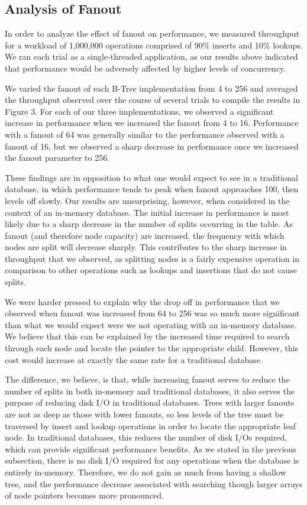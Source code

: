 \documentclass{sig-alternate}
\begin{document}
\subsection{Analysis of Fanout}
In order to analyze the effect of fanout on performance, we measured throughput for a workload of 1,000,000 operations comprised of 90\% inserts and 10\% lookups. We ran each trial as a single-threaded application, as our results above indicated that performance would be adversely affected by higher levels of concurrency.

We varied the fanout of each B-Tree implementation from 4 to 256 and averaged the throughput observed over the course of several trials to compile the results in Figure 3. For each of our three implementations, we observed a significant increase in performance when we increased the fanout from 4 to 16. Performance with a fanout of 64 was generally similar to the performance observed with a fanout of 16, but we observed a sharp decrease in performance once we increased the fanout parameter to 256. 

These findings are in opposition to what one would expect to see in a traditional database, in which performance tends to peak when fanout approaches 100, then levels off slowly. Our results are unsurprising, however, when considered in the context of an in-memory database. The initial increase in performance is most likely due to a sharp decrease in the number of splits occurring in the table. As fanout (and therefore node capacity) are increased, the frequency with which nodes are split will decrease sharply. This contributes to the sharp increase in throughput that we observed, as splitting nodes is a fairly expensive operation in comparison to other operations such as lookups and insertions that do not cause splits. 

We were harder pressed to explain why the drop off in performance that we observed when fanout was increased from 64 to 256 was so much more significant than what we would expect were we not operating with an in-memory database. We believe that this can be explained by the increased time required to search through each node and locate the pointer to the appropriate child. However, this cost would increase at exactly the same rate for a traditional database. 

The difference, we believe, is that, while increasing fanout serves to reduce the number of splits in both in-memory and traditional databases, it also serves the purpose of reducing disk I/O in traditional databases. Trees with larger fanouts are not as deep as those with lower fanouts, so less levels of the tree must be traversed by insert and lookup operations in order to locate the appropriate leaf node. In traditional databases, this reduces the number of disk I/Os required, which can provide significant performance benefits. As we stated in the previous subsection, there is no disk I/O required for any operations when the database is entirely in-memory. Therefore, we do not gain as much from having a shallow tree, and the performance decrease associated with searching though larger arrays of node pointers becomes more pronounced.
\end{document}
